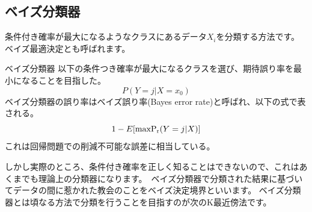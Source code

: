 \documentclass[uplatex]{jsarticle}
\begin{document}
\subsection{ベイズ分類器}
条件付き確率が最大になるようなクラスにあるデータ$X_i$を分類する方法です。ベイズ最適決定とも呼ばれます。
\begin{itembox}[l]{ベイズ分類器}
  以下の条件つき確率が最大になるクラスを選び、期待誤り率を最小になることを目指した。
  $$P(Y = j|X = x_0)$$
  ベイズ分類器の誤り率はベイズ誤り率(Bayes error rate)と呼ばれ、以下の式で表される。\
  $$1 - E[{\rm max P_r}(Y = j|X)]$$
  これは回帰問題での削減不可能な誤差に相当している。
\end{itembox}
しかし実際のところ、条件付き確率を正しく知ることはできないので、これはあくまでも理論上の分類器になります。\
ベイズ分類器で分類された結果に基づいてデータの間に惹かれた教会のことをベイズ決定境界といいます。
ベイズ分類器とは頃なる方法で分類を行うことを目指すのが次のK最近傍法です。
\end{document}
